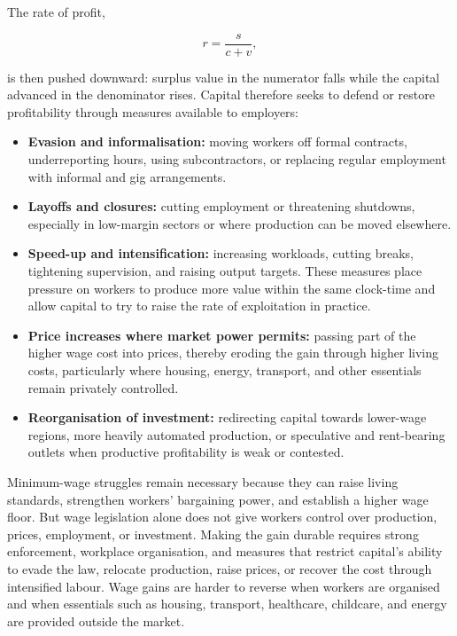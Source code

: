 The rate of profit,

\[
r=\frac{s}{c+v},
\]

is then pushed downward: surplus value in the numerator falls while the capital
advanced in the denominator rises. Capital therefore seeks to defend or restore
profitability through measures available to employers:

\begin{itemize}[leftmargin=1.5em]
  \item \textbf{Evasion and informalisation:} moving workers off formal
  contracts, underreporting hours, using subcontractors, or replacing regular
  employment with informal and gig arrangements.

  \item \textbf{Layoffs and closures:} cutting employment or threatening
  shutdowns, especially in low-margin sectors or where production can be moved
  elsewhere.

  \item \textbf{Speed-up and intensification:} increasing workloads, cutting
  breaks, tightening supervision, and raising output targets. These measures
  place pressure on workers to produce more value within the same clock-time
  and allow capital to try to raise the rate of exploitation in practice.

  \item \textbf{Price increases where market power permits:} passing part of
  the higher wage cost into prices, thereby eroding the gain through higher
  living costs, particularly where housing, energy, transport, and other
  essentials remain privately controlled.

  \item \textbf{Reorganisation of investment:} redirecting capital towards
  lower-wage regions, more heavily automated production, or speculative and
  rent-bearing outlets when productive profitability is weak or contested.
\end{itemize}

Minimum-wage struggles remain necessary because they can raise living standards,
strengthen workers' bargaining power, and establish a higher wage floor. But wage
legislation alone does not give workers control over production, prices, employment,
or investment. Making the gain durable requires
strong enforcement, workplace organisation, and measures that restrict
capital's ability to evade the law, relocate production, raise prices, or
recover the cost through intensified labour. Wage gains are harder to reverse
when workers are organised and when essentials such as housing, transport,
healthcare, childcare, and energy are provided outside the market.


